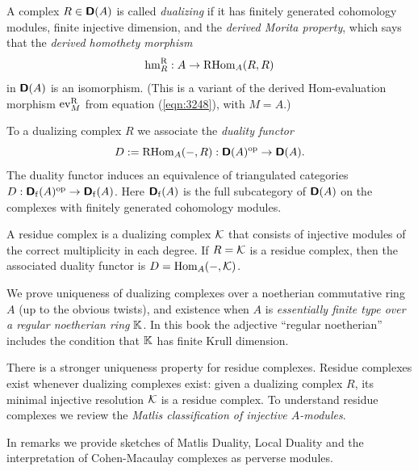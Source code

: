 A complex $R \in \boldsymbol{\mathsf{D}}(A)$ is called {\em dualizing} if it has finitely 
generated cohomology modules, finite injective dimension, and the {\em derived 
Morita property}, which says that the {\em derived homothety morphism}
\begin{equation} \label{eqn:4670}
\operatorname{hm}^{\mathrm{R}}_{R} : A \to \operatorname{RHom}_{A}(R, R)
\end{equation}
in $\boldsymbol{\mathsf{D}}(A)$ is an isomorphism. 
(This is a variant of the derived Hom-evaluation morphism 
$\operatorname{ev}^{\mathrm{R}}_M$ from equation (\ref{eqn:3248}), with 
$M = A$.)

To a dualizing complex $R$ we associate the {\em duality functor}
\[ D := \operatorname{RHom}_{A}(-, R) : \boldsymbol{\mathsf{D}}(A)^{\mathrm{op}}
\to \boldsymbol{\mathsf{D}}(A) . \]
The duality functor induces an equivalence of triangulated categories
$D : \dcat{D}_{\mrm{f}}(A)^{\mrm{op}} \lb \to \dcat{D}_{\mrm{f}}(A)$.
Here $\boldsymbol{\mathsf{D}}_{\mathrm{f}}(A)$ is the full subcategory of $\boldsymbol{\mathsf{D}}(A)$
on the complexes with finitely generated cohomology modules. 

A residue complex is a dualizing complex 
$\mathcal{K}$ that consists of injective modules of the correct multiplicity in each 
degree. If $R = \mathcal{K}$ is a residue complex, then the associated duality functor 
is $D = \operatorname{Hom}_{A}(-, \mathcal{K})$.

We prove uniqueness of dualizing complexes over a noetherian commutative ring 
$A$ (up to the obvious twists), and existence when $A$ is {\em essentially 
finite type over a regular noetherian ring} $\mathbb{K}$. In this book the adjective 
``regular noetherian'' includes the condition that $\mathbb{K}$ has finite Krull 
dimension. 

There is a stronger uniqueness property for residue complexes. 
Residue complexes exist whenever dualizing complexes exist: given a dualizing 
complex $R$, its minimal injective resolution $\mathcal{K}$ is a residue complex. 
To understand residue complexes we review the {\em Matlis classification of 
injective $A$-modules}.  

In remarks we provide sketches of Matlis Duality, Local Duality and the 
interpretation of Cohen-Macaulay complexes as perverse modules.  

